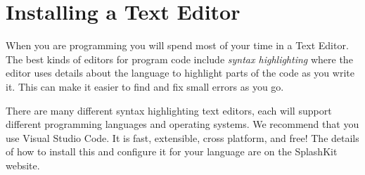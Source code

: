 \clearpage
\def\pageLang{none}
\section{Installing a Text Editor} %
\label{sec:installing_a_text_editor}

When you are programming you will spend most of your time in a Text Editor. The best kinds of editors for program code include \emph{syntax highlighting} where the editor uses details about the language to highlight parts of the code as you write it. This can make it easier to find and fix small errors as you go.

There are many different syntax highlighting text editors, each will support different programming languages and operating systems. We recommend that you use Visual Studio Code. It is fast, extensible, cross platform, and free! The details of how to install this and configure it for your language are on the SplashKit website.



